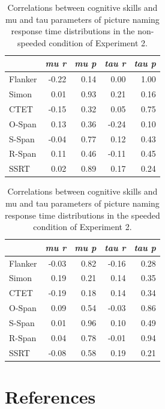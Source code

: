 \documentclass[
  man,floatsintext]{apa6}
\begin{document}
\begin{table}

\caption{\label{tab:cormutauE2}Correlations between cognitive skills and mu and tau parameters of picture naming response time distributions in the non-speeded condition of Experiment 2.}
\centering
\begin{tabular}[t]{lrrrr}
\toprule
\em{ } & \em{mu r} & \em{mu p} & \em{tau r} & \em{tau p}\\
\midrule
Flanker & -0.22 & 0.14 & 0.00 & 1.00\\
Simon & 0.01 & 0.93 & 0.21 & 0.16\\
CTET & -0.15 & 0.32 & 0.05 & 0.75\\
O-Span & 0.13 & 0.36 & -0.24 & 0.10\\
S-Span & -0.04 & 0.77 & 0.12 & 0.43\\
\addlinespace
R-Span & 0.11 & 0.46 & -0.11 & 0.45\\
SSRT & 0.02 & 0.89 & 0.17 & 0.24\\
\bottomrule
\end{tabular}
\end{table}

\begin{table}

\caption{\label{tab:cormutauE2s}Correlations between cognitive skills and mu and tau parameters of picture naming response time distributions in the speeded condition of Experiment 2.}
\centering
\begin{tabular}[t]{lrrrr}
\toprule
\em{ } & \em{mu r} & \em{mu p} & \em{tau r} & \em{tau p}\\
\midrule
Flanker & -0.03 & 0.82 & -0.16 & 0.28\\
Simon & 0.19 & 0.21 & 0.14 & 0.35\\
CTET & -0.19 & 0.18 & 0.14 & 0.34\\
O-Span & 0.09 & 0.54 & -0.03 & 0.86\\
S-Span & 0.01 & 0.96 & 0.10 & 0.49\\
\addlinespace
R-Span & 0.04 & 0.78 & -0.01 & 0.94\\
SSRT & -0.08 & 0.58 & 0.19 & 0.21\\
\bottomrule
\end{tabular}
\end{table}

\clearpage

\hypertarget{references}{%
\section{References}\label{references}}
\end{document}
